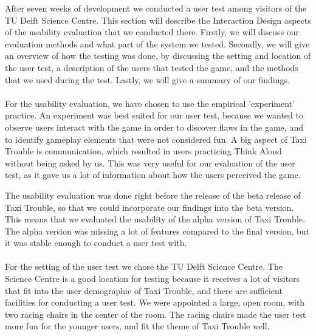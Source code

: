 After seven weeks of development we conducted a user test among visitors of the TU Delft Science Centre. This section will describe the Interaction Design aspects of the usability evaluation that we conducted there. Firstly, we will discuss our evaluation methods and what part of the system we tested. Secondly, we will give an overview of how the testing was done, by discussing the setting and location of the user test, a description of the users that tested the game, and the methods that we used during the test. Lastly, we will give a summary of our findings.
\\\\
For the usability evaluation, we have chosen to use the empirical 'experiment' practice. An experiment was best suited for our user test, because we wanted to observe users interact with the game in order to discover flaws in the game, and to identify gameplay elements that were not considered fun. A big aspect of Taxi Trouble is communication, which resulted in users practicing Think Aloud without being asked by us. This was very useful for our evaluation of the user test, as it gave us a lot of information about how the users perceived the game.

The usability evaluation was done right before the release of the beta release of Taxi Trouble, so that we could incorporate our findings into the beta version. This means that we evaluated the usability of the alpha version of Taxi Trouble. The alpha version was missing a lot of features compared to the final version, but it was stable enough to conduct a user test with.
\\\\
For the setting of the user test we chose the TU Delft Science Centre. The Science Centre is a good location for testing because it receives a lot of visitors that fit into the user demographic of Taxi Trouble, and there are sufficient facilities for conducting a user test. We were appointed a large, open room, with two racing chairs in the center of the room. The racing chairs made the user test more fun for the younger users, and fit the theme of Taxi Trouble well.

